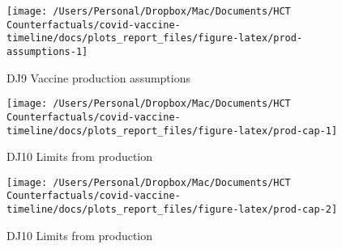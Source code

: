 \documentclass[
  12pt,
]{article}
\begin{document}
\begin{figure}

{\centering \texttt{[image: /Users/Personal/Dropbox/Mac/Documents/HCT Counterfactuals/covid-vaccine-timeline/docs/plots\_report\_files/figure-latex/prod-assumptions-1]} 

}

\caption{DJ9 Vaccine production assumptions}\label{fig:prod-assumptions}
\end{figure}

\begin{figure}

{\centering \texttt{[image: /Users/Personal/Dropbox/Mac/Documents/HCT Counterfactuals/covid-vaccine-timeline/docs/plots\_report\_files/figure-latex/prod-cap-1]} 

}

\caption{DJ10 Limits from production}\label{fig:prod-cap-1}
\end{figure}
\begin{figure}

{\centering \texttt{[image: /Users/Personal/Dropbox/Mac/Documents/HCT Counterfactuals/covid-vaccine-timeline/docs/plots\_report\_files/figure-latex/prod-cap-2]} 

}

\caption{DJ10 Limits from production}\label{fig:prod-cap-2}
\end{figure}
\end{document}
